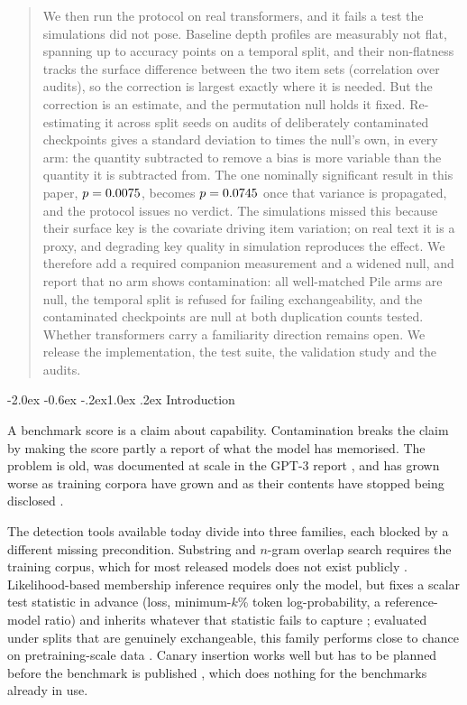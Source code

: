 \documentclass[10pt,twocolumn,letterpaper]{article}
\makeatletter
\renewcommand\section{\@startsection{section}{1}{\z@}%
  {-2.0ex \@plus -0.6ex \@minus -.2ex}{1.0ex \@plus .2ex}%
  {\normalfont\large\bfseries}}
\makeatother
\begin{document}
\begin{abstract}
We then run the protocol on real transformers, and it fails a test the
simulations did not pose. Baseline depth profiles are measurably not flat,
spanning up to \PoneWkSpanHi{} accuracy points on a temporal split, and their
non-flatness tracks the surface difference between the two item sets
(correlation \PoneCorr{} over \PoneN{} audits), so the correction is largest
exactly where it is needed. But the correction is an estimate, and the
permutation null holds it fixed. Re-estimating it across split seeds on
\PthreeN{} audits of deliberately contaminated checkpoints gives a standard
deviation \PthreeRatioLo{} to \PthreeRatioHi{} times the null's own, in every
arm: the quantity subtracted to remove a bias is more variable than the
quantity it is subtracted from. The one nominally significant result in this
paper, $p=\PthreeBlockedP{}$, becomes $p=\PthreeBlockedPinfl{}$ once that
variance is propagated, and the protocol issues no verdict. The simulations
missed this because their surface key is the covariate driving item variation;
on real text it is a proxy, and degrading key quality in simulation reproduces
the effect. We therefore add a required companion measurement and a widened
null, and report that no arm shows contamination: all \PonePileNulls{}
well-matched Pile arms are null, the temporal split is refused for failing
exchangeability, and the contaminated checkpoints are null at both duplication
counts tested. Whether transformers carry a familiarity direction remains
open. We release the implementation, the test suite, the validation study and
the audits.
\end{abstract}

\section{Introduction}

A benchmark score is a claim about capability. Contamination breaks the claim by making the score partly a report of what the model has memorised. The problem is old, was documented at scale in the GPT-3 report \cite{brown2020gpt3}, and has grown worse as training corpora have grown and as their contents have stopped being disclosed \cite{sainz2023trouble,balloccu2024leak}.

The detection tools available today divide into three families, each blocked by a different missing precondition. Substring and $n$-gram overlap search requires the training corpus, which for most released models does not exist publicly \cite{dodge2021documenting,elazar2024wimbd}. Likelihood-based membership inference requires only the model, but fixes a scalar test statistic in advance (loss, minimum-$k$\% token log-probability, a reference-model ratio) and inherits whatever that statistic fails to capture \cite{shi2024minkprob,zhang2025minkpp,mattern2023neighbourhood}; evaluated under splits that are genuinely exchangeable, this family performs close to chance on pretraining-scale data \cite{duan2024mia}. Canary insertion works well but has to be planned before the benchmark is published \cite{carlini2019secretsharer}, which does nothing for the benchmarks already in use.
\end{document}
